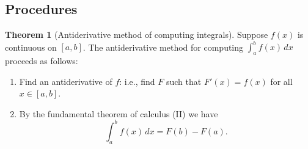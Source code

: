 \documentclass[11pt]{article}
\theoremstyle{definition}
\theoremstyle{named}
\newtheorem*{namedtheorem}{Theorem}
\numberwithin{myalgctr}{section}
\begin{document}
\subsection*{Procedures}
\begin{namedtheorem}[Antiderivative method of computing integrals] Suppose $f(x)$ is continuous on $[a,b]$. The antiderivative method for computing $\int_a^b f(x)\, dx$ proceeds as follows:
  \begin{enumerate}
    \item Find an antiderivative of $f$: i.e., find $F$ such that $F'(x)=f(x)$ for all $x\in [a,b]$.
    \item By the fundamental theorem of calculus (II) we have
    \[
      \int_a^bf(x)\, dx=F(b)-F(a).
    \]
  \end{enumerate}

\end{namedtheorem}

\end{document}
